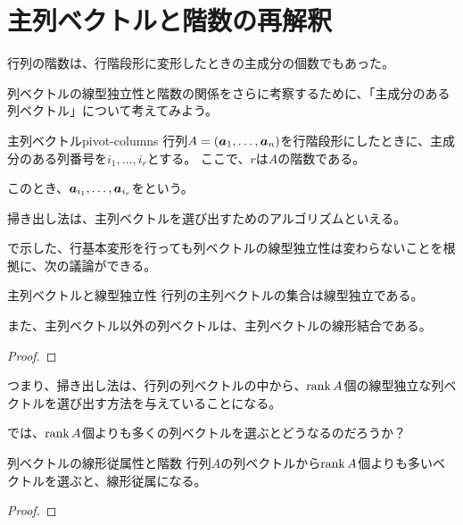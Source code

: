 \documentclass[../../../topic_linear-algebra]{subfiles}
\begin{document}
\sectionline
\section{主列ベクトルと階数の再解釈}

行列の階数は、行階段形に変形したときの主成分の個数でもあった。

列ベクトルの線型独立性と階数の関係をさらに考察するために、「主成分のある列ベクトル」について考えてみよう。

\begin{definition}{主列ベクトル}{pivot-columns}
  行列$A = (\vb*{a}_1, \dots, \vb*{a}_n)$を行階段形にしたときに、主成分のある列番号を$i_1,\dots, i_r$とする。
  ここで、$r$は$A$の階数である。

  このとき、$\vb*{a}_{i_1}, \dots, \vb*{a}_{i_r}$をという。
\end{definition}

掃き出し法は、主列ベクトルを選び出すためのアルゴリズムといえる。

\br

で示した、行基本変形を行っても列ベクトルの線型独立性は変わらないことを根拠に、次の議論ができる。

\begin{theorem*}{主列ベクトルと線型独立性}
  行列の主列ベクトルの集合は線型独立である。

  また、主列ベクトル以外の列ベクトルは、主列ベクトルの線形結合である。
\end{theorem*}

\begin{proof}
\end{proof}

\br

つまり、掃き出し法は、行列の列ベクトルの中から、$\rank A$個の線型独立な列ベクトルを選び出す方法を与えていることになる。

\br

では、$\rank A$個よりも多くの列ベクトルを選ぶとどうなるのだろうか？

\begin{theorem*}{列ベクトルの線形従属性と階数}
  行列$A$の列ベクトルから$\rank A$個よりも多いベクトルを選ぶと、線形従属になる。
\end{theorem*}

\begin{proof}
\end{proof}
\end{document}
